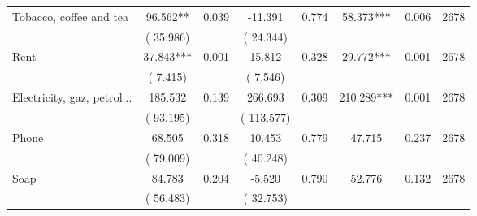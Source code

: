 \begin{tabular}{l*{7}{c}}
 Tobacco, coffee and tea       &             96.562**       &        0.039  &            -11.391       &        0.774  &             58.373***       &              0.006 &  2678 \\ 
                       &       (      35.986)             &                               &       (      24.344)                     &                               &                                               &                                &                      \\ 

 Rent       &             37.843***       &        0.001  &             15.812       &        0.328  &             29.772***       &              0.001 &  2678 \\ 
                       &       (       7.415)             &                               &       (       7.546)                     &                               &                                               &                                &                      \\ 

 Electricity, gaz, petrol...       &            185.532       &        0.139  &            266.693       &        0.309  &            210.289***       &              0.001 &  2678 \\ 
                       &       (      93.195)             &                               &       (     113.577)                     &                               &                                               &                                &                      \\ 

 Phone       &             68.505       &        0.318  &             10.453       &        0.779  &             47.715       &              0.237 &  2678 \\ 
                       &       (      79.009)             &                               &       (      40.248)                     &                               &                                               &                                &                      \\ 

 Soap       &             84.783       &        0.204  &             -5.520       &        0.790  &             52.776       &              0.132 &  2678 \\ 
                       &       (      56.483)             &                               &       (      32.753)                     &                               &                                               &                                &                      \\ 


\end{tabular}
